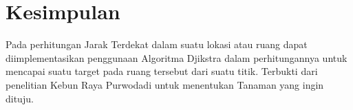 \documentclass[conference]{IEEEtran}
\begin{document}
\section{Kesimpulan}
Pada perhitungan Jarak Terdekat dalam suatu lokasi atau ruang
dapat diimplementasikan penggunaan Algoritma Djikstra
dalam perhitungannya untuk mencapai suatu target pada ruang
tersebut dari suatu titik. Terbukti dari penelitian Kebun Raya
Purwodadi untuk menentukan Tanaman yang ingin dituju.



\end{document}
